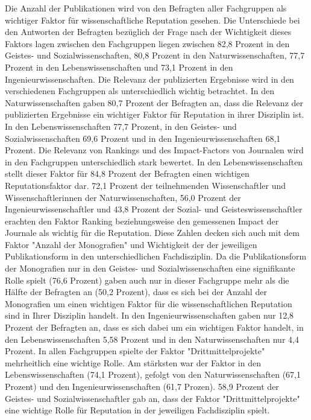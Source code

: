 Die Anzahl der Publikationen wird von den Befragten aller Fachgruppen als wichtiger Faktor für wissenschaftliche Reputation gesehen. Die Unterschiede bei den Antworten der Befragten bezüglich der Frage nach der Wichtigkeit dieses Faktors lagen zwischen den Fachgruppen liegen zwischen 82,8 Prozent in den Geistes- und Sozialwissenschaften, 80,8 Prozent in den Naturwissenschaften, 77,7 Prozent in den Lebenswissenschaften und 73,1 Prozent in den Ingenieurwissenschaften. Die Relevanz der publizierten Ergebnisse wird in den verschiedenen Fachgruppen als unterschiedlich wichtig betrachtet. In den Naturwissenschaften gaben 80,7 Prozent der Befragten an, dass die Relevanz der publizierten Ergebnisse ein wichtiger Faktor für Reputation in ihrer Disziplin ist. In den Lebenswissenschaften 77,7 Prozent, in den Geistes- und Sozialwissenschaften 69,6 Prozent und in den Ingenieurwissenschaften 68,1 Prozent. Die Relevanz von Rankings und des Impact-Factors von Journalen wird in den Fachgruppen unterschiedlich stark bewertet. In den Lebenswissenschaften stellt dieser Faktor für 84,8 Prozent der Befragten einen wichtigen Reputationsfaktor dar. 72,1 Prozent der teilnehmenden Wissenschaftler und Wissenschaftlerinnen der Naturwissenschaften, 56,0 Prozent der Ingenieurwissenschaftler und 43,8 Prozent der Sozial- und Geisteswissenschaftler erachten den Faktor Ranking beziehungsweise den gemessenen Impact der Journale als wichtig für die Reputation. Diese Zahlen decken sich auch mit dem Faktor "Anzahl der Monografien" und Wichtigkeit der der jeweiligen Publikationsform in den unterschiedlichen Fachdisziplin. Da die Publikationsform der Monografien nur in den Geistes- und Sozialwissenschaften eine signifikante Rolle spielt (76,6 Prozent) gaben auch nur in dieser Fachgruppe mehr als die Hälfte der Befragten an (50,2 Prozent), dass es sich bei der Anzahl der Monografien um einen wichtigen Faktor für die wissenschaftlichen Reputation sind in Ihrer Disziplin handelt. In den Ingenieurwissenschaften gaben nur 12,8 Prozent der Befragten an, dass es sich dabei um ein wichtigen Faktor handelt, in den Lebenswissenschaften 5,58 Prozent und in den Naturwissenschaften nur 4,4 Prozent. In allen Fachgruppen spielte der Faktor "Drittmittelprojekte" mehrheitlich eine wichtige Rolle. Am stärksten war der Faktor in den Lebenswissenschaften (74,1 Prozent), gefolgt von den Naturwissenschaften (67,1 Prozent) und den Ingenieurwissenschaften (61,7 Prozen). 58,9 Prozent der Geistes- und Sozialwissenschaftler gab an, dass der Faktor "Drittmittelprojekte" eine wichtige Rolle für Reputation in der jeweiligen Fachdisziplin spielt.

